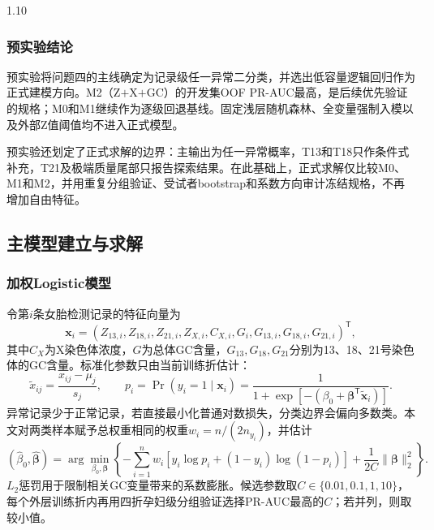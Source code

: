 \documentclass[12pt,a4paper]{ctexrep}
\numberwithin{equation}{section}
\begin{document}
\begin{spacing}{1.10}
{			\subsubsection{预实验结论}
			预实验将问题四的主线确定为记录级任一异常二分类，并选出低容量逻辑回归作为正式建模方向。M2（Z$+$X$+$GC）的开发集OOF PR-AUC最高，是后续优先验证的规格；M0和M1继续作为逐级回退基线。固定浅层随机森林、全变量强制入模以及外部Z值阈值均不进入正式模型。

			预实验还划定了正式求解的边界：主输出为任一异常概率，T13和T18只作条件式补充，T21及极端质量尾部只报告探索结果。在此基础上，正式求解仅比较M0、M1和M2，并用重复分组验证、受试者bootstrap和系数方向审计冻结规格，不再增加自由特征。
			
			\subsection{主模型建立与求解}
			\subsubsection{加权Logistic模型}
			令第$i$条女胎检测记录的特征向量为
			\begin{equation}
			\boldsymbol{x}_i=(Z_{13,i},Z_{18,i},Z_{21,i},Z_{X,i},C_{X,i},G_i,G_{13,i},G_{18,i},G_{21,i})^{\mathsf T},
			\label{eq:q4_feature_vector}
			\end{equation}
			其中$C_X$为X染色体浓度，$G$为总体GC含量，$G_{13},G_{18},G_{21}$分别为13、18、21号染色体的GC含量。标准化参数只由当前训练折估计：
			\begin{equation}
			\widetilde{x}_{ij}=\frac{x_{ij}-\mu_j}{s_j},\qquad
			p_i=\Pr(y_i=1\mid\boldsymbol{x}_i)
			=\frac{1}{1+\exp[-(\beta_0+\boldsymbol{\beta}^{\mathsf T}\widetilde{\boldsymbol{x}}_i)]}.
			\label{eq:q4_logistic_model}
			\end{equation}
			异常记录少于正常记录，若直接最小化普通对数损失，分类边界会偏向多数类。本文对两类样本赋予总权重相同的权重$w_i=n/(2n_{y_i})$，并估计
			\begin{equation}
			(\widehat{\beta}_0,\widehat{\boldsymbol{\beta}})
			=\arg\min_{\beta_0,\boldsymbol{\beta}}
			\left\{-\sum_{i=1}^{n}w_i\left[y_i\log p_i+(1-y_i)\log(1-p_i)\right]
			+\frac{1}{2C}\lVert\boldsymbol{\beta}\rVert_2^2\right\}.
			\label{eq:q4_weighted_objective}
			\end{equation}
			$L_2$惩罚用于限制相关GC变量带来的系数膨胀。候选参数取$C\in\{0.01,0.1,1,10\}$，每个外层训练折内再用四折孕妇级分组验证选择PR-AUC最高的$C$；若并列，则取较小值。

}
\end{spacing}
\end{document}
